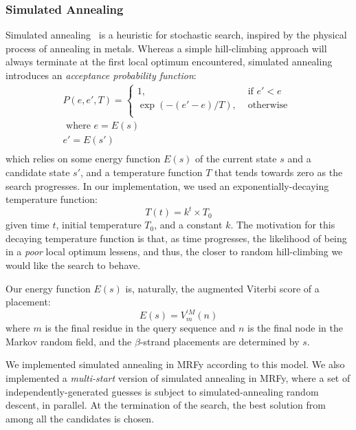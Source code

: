 \documentclass{acm_proc_article-sp}
\begin{document}
\subsubsection{Simulated Annealing}

Simulated annealing~\cite{Kirkpatrick:1983wa} is a heuristic for stochastic search,
inspired by the physical process of annealing in metals.
Whereas a simple hill-climbing approach will always terminate at the first 
local optimum encountered,
simulated annealing introduces an \emph{acceptance probability function}:
\begin{equation*}
  \begin{split}
  P(e,e',T) = \begin{cases}
    1, & \text{ if } e' < e\\
    \exp(-(e'-e)/T),& \text{ otherwise }\\
\end{cases}\\
  \text{ where }
     e = E(s) \\
     e' = E(s')\\
  \end{split}
\end{equation*}
which relies on some energy function $E(s)$ of the current state $s$ and
a candidate state $s'$, and a temperature function $T$ that tends towards zero
as the search progresses.
In our implementation, we used an exponentially-decaying temperature function:
\begin{equation*}
  T(t) = k^{t}\times T_{0}
\end{equation*}
given time $t$, initial temperature $T_{0}$, and a constant $k$.
The motivation for this decaying temperature function is that, as time 
progresses, the likelihood of being in a \emph{poor} local optimum lessens, and
thus, the closer to random hill-climbing we would like the search to behave.


Our energy function $E(s)$ is, naturally, the augmented Viterbi score of a
placement:
\begin{equation*}
  E(s) = V_{m}^{\prime M}(n)
\end{equation*}
where $m$ is the final residue in the query sequence and $n$ is the final
node in the Markov random field, and the $\beta$-strand placements are 
determined by $s$.

We implemented simulated annealing in MRFy according to this model.
We also implemented a \emph{multi-start} version of simulated annealing in MRFy,
where a set of independently-generated guesses is subject to simulated-annealing
random descent, in parallel.
At the termination of the search, the best solution from among all the 
candidates is chosen.
\end{document}
